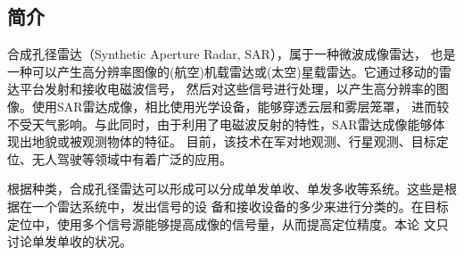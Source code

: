 \documentclass{xduugthesis}
\begin{document}
\subsection{简介}
合成孔径雷达（Synthetic Aperture Radar, SAR）\cite{SAR_Introduction}，属于一种微波成像雷达，
也是一种可以产生高分辨率图像的(航空)机载雷达或(太空)星载雷达。它通过移动的雷达平台发射和接收电磁波信号，
然后对这些信号进行处理，以产生高分辨率的图像。使用SAR雷达成像，相比使用光学设备，能够穿透云层和雾层笼罩，
进而较不受天气影响。与此同时，由于利用了电磁波反射的特性，SAR雷达成像能够体现出地貌或被观测物体的特征。
目前，该技术在军对地观测、行星观测、目标定位、无人驾驶等领域中有着广泛的应用。\par
根据种类，合成孔径雷达可以形成可以分成单发单收、单发多收等系统。这些是根据在一个雷达系统中，发出信号的设
备和接收设备的多少来进行分类的。在目标定位中，使用多个信号源能够提高成像的信号量，从而提高定位精度。本论
文只讨论单发单收的状况。
\end{document}
